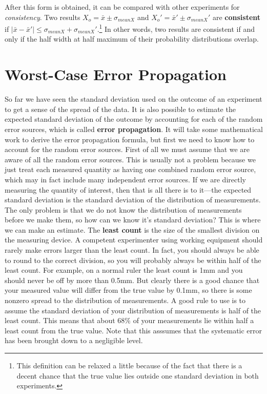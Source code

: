 After this form is obtained, it can be compared with other experiments for {\it consistency}. Two results $X_o = \bar{x} \pm \sigma_{mean X}$ and $X_o' = \bar{x}' \pm \sigma_{mean X}'$ are {\bf consistent} if  $|\bar{x} - \bar{x}'| \leq \sigma_{mean X} + \sigma_{mean X}'$.\footnote{This definition can be relaxed a little because of the fact that there is a decent chance that the true value lies outside one standard deviation in both experiments.}
In other words, two results are consistent if and only if the half width at half maximum of their probability distributions overlap. 



\section{Worst-Case Error Propagation}
So far we have seen the standard deviation used on the outcome of an experiment to get a sense of the spread of the data. It is also possible to estimate the expected standard deviation of the outcome by accounting for each of the random error sources, which is called {\bf error propagation}. It will take some mathematical work to derive the error propagation formula, but first we need to know how to account for the random error sources. First of all we must assume that we are aware of all the random error sources. This is usually not a problem because we just treat each measured quantity as having one combined random error source, which may in fact include many independent error sources. If we are directly measuring the quantity of interest, then that is all there is to it---the expected standard deviation is the standard deviation of the distribution of measurements. The only problem is that we do not know the distribution of measurements before we make them, so how can we know it's standard deviation? This is where we can make an estimate. The {\bf least count} is the size of the smallest division on the measuring device. A competent experimenter using working equipment should rarely make errors larger than the least count. In fact, you should always be able to round to the correct division, so you will probably always be within half of the least count. For example, on a normal ruler the least count is 1mm and you should never be off by more than 0.5mm. But clearly there is a good chance that your measured value will differ from the true value by 0.1mm, so there is some nonzero spread to the distribution of measurements. A good rule to use is to assume the standard deviation of your distribution of measurements is half of the least count. This means that about $68\%$ of your measurements lie within half a least count from the true value. Note that this asssumes that the systematic error has been brought down to a negligible level.

